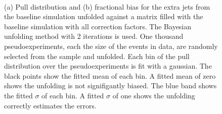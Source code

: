\begin{figure}
~
\caption{(a) Pull distribution and (b) fractional bias for the extra jets from the baseline \ttbar simulation unfolded against a matrix filled with the baseline \ttbar simulation with all correction factors. The Bayesian unfolding method with 2 iterations is used. One thousand pseudoexperiments, each the size of the events in data, are randomly selected from the sample and unfolded. Each bin of the pull distribution over the pseudoexperiments is fit with a gaussian. The black points show the fitted mean of each bin. A fitted mean of zero shows the unfolding is not signifigantly biased. The blue band shows the fitted $\sigma$ of each bin. A fitted $\sigma$ of one shows the unfolding correctly estimates the errors.}
\label{fig:UnfoldPull}
\end{figure}

